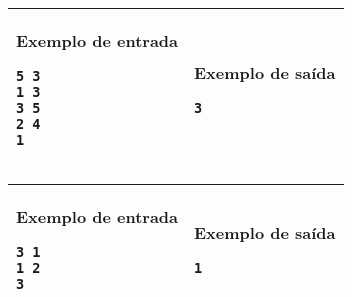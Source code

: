 \begin{table}[!h]
\centering
\begin{tabular}{|l|l|}
\hline
\begin{minipage}[t]{3in}
\textbf{Exemplo de entrada}
\begin{verbatim}
5 3
1 3
3 5
2 4
1
\end{verbatim}
\vspace{1mm}
\end{minipage}
&

\begin{minipage}[t]{3in}
\textbf{Exemplo de saída}
\begin{verbatim}
3
\end{verbatim}
\vspace{1mm}
\end{minipage} \\
\hline
\end{tabular}
\end{table}

\begin{table}[!h]
\centering
\begin{tabular}{|l|l|}
\hline
\begin{minipage}[t]{3in}
\textbf{Exemplo de entrada}
\begin{verbatim}
3 1
1 2
3
\end{verbatim}
\vspace{1mm}
\end{minipage}
&

\begin{minipage}[t]{3in}
\textbf{Exemplo de saída}
\begin{verbatim}
1
\end{verbatim}
\vspace{1mm}
\end{minipage} \\
\hline
\end{tabular}
\end{table}
